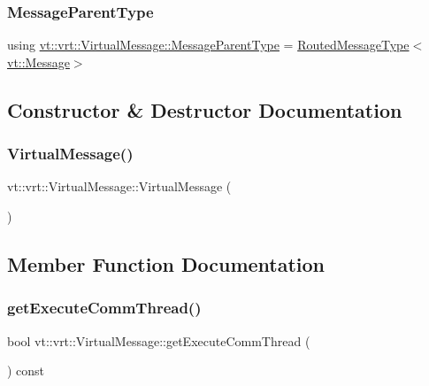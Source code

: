 \subsubsection{\texorpdfstring{Message\+Parent\+Type}{MessageParentType}}
{\footnotesize\ttfamily using \hyperlink{structvt_1_1vrt_1_1_virtual_message_acb60e6224a32e6d0a6fce939f511737a}{vt\+::vrt\+::\+Virtual\+Message\+::\+Message\+Parent\+Type} =  \hyperlink{namespacevt_1_1vrt_a00a8c6e49603fd62cd0a3fbd99277e36}{Routed\+Message\+Type}$<$\hyperlink{namespacevt_a3a3ddfef40b4c90915fa43cdd5f129ea}{vt\+::\+Message}$>$}



\subsection{Constructor \& Destructor Documentation}
\mbox{\label{structvt_1_1vrt_1_1_virtual_message_a28ae0fd29c23d4e9552e659ff7f66cd5}} 
\subsubsection{\texorpdfstring{Virtual\+Message()}{VirtualMessage()}}
{\footnotesize\ttfamily vt\+::vrt\+::\+Virtual\+Message\+::\+Virtual\+Message (\begin{DoxyParamCaption}{ }\end{DoxyParamCaption})\hspace{0.3cm}{\ttfamily [default]}}



\subsection{Member Function Documentation}
\mbox{\label{structvt_1_1vrt_1_1_virtual_message_a9511339ccb737b655708c9071965dc76}} 
\subsubsection{\texorpdfstring{get\+Execute\+Comm\+Thread()}{getExecuteCommThread()}}
{\footnotesize\ttfamily bool vt\+::vrt\+::\+Virtual\+Message\+::get\+Execute\+Comm\+Thread (\begin{DoxyParamCaption}{ }\end{DoxyParamCaption}) const\hspace{0.3cm}{\ttfamily [inline]}}

